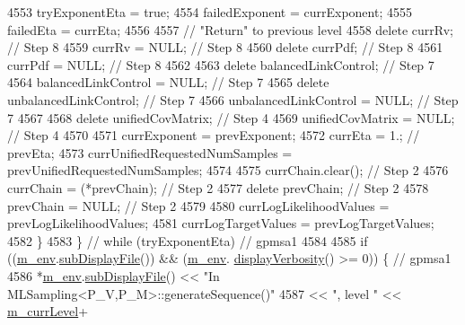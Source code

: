 \begin{DoxyCode}
{{4553       tryExponentEta = \textcolor{keyword}{true};
4554       failedExponent = currExponent;
4555       failedEta      = currEta;
4556 
4557       \textcolor{comment}{// "Return" to previous level}
4558       \textcolor{keyword}{delete} currRv;                 \textcolor{comment}{// Step 8}
4559       currRv = NULL;                 \textcolor{comment}{// Step 8}
4560       \textcolor{keyword}{delete} currPdf;                \textcolor{comment}{// Step 8}
4561       currPdf = NULL;                \textcolor{comment}{// Step 8}
4562 
4563       \textcolor{keyword}{delete} balancedLinkControl;    \textcolor{comment}{// Step 7}
4564       balancedLinkControl   = NULL;  \textcolor{comment}{// Step 7}
4565       \textcolor{keyword}{delete} unbalancedLinkControl;  \textcolor{comment}{// Step 7}
4566       unbalancedLinkControl = NULL;  \textcolor{comment}{// Step 7}
4567 
4568       \textcolor{keyword}{delete} unifiedCovMatrix;       \textcolor{comment}{// Step 4}
4569       unifiedCovMatrix = NULL;       \textcolor{comment}{// Step 4}
4570 
4571       currExponent                   = prevExponent;
4572       currEta                        = 1.; \textcolor{comment}{// prevEta;}
4573       currUnifiedRequestedNumSamples = prevUnifiedRequestedNumSamples;
4574 
4575       currChain.clear();             \textcolor{comment}{// Step 2}
4576       currChain = (*prevChain);      \textcolor{comment}{// Step 2}
4577       \textcolor{keyword}{delete} prevChain;              \textcolor{comment}{// Step 2}
4578       prevChain = NULL;              \textcolor{comment}{// Step 2}
4579 
4580       currLogLikelihoodValues        = prevLogLikelihoodValues;
4581       currLogTargetValues            = prevLogTargetValues;
4582     \}
4583     \} \textcolor{comment}{// while (tryExponentEta) // gpmsa1}
4584 
4585     \textcolor{keywordflow}{if} ((\hyperlink{class_q_u_e_s_o_1_1_m_l_sampling_a13f1ca4fe9f94822fe572a743eaced1d}{m\_env}.\hyperlink{class_q_u_e_s_o_1_1_base_environment_a8a0064746ae8dddfece4229b9ad374d6}{subDisplayFile}()) && (\hyperlink{class_q_u_e_s_o_1_1_m_l_sampling_a13f1ca4fe9f94822fe572a743eaced1d}{m\_env}.
      \hyperlink{class_q_u_e_s_o_1_1_base_environment_a1fe5f244fc0316a0ab3e37463f108b96}{displayVerbosity}() >= 0)) \{ \textcolor{comment}{// gpmsa1}
4586       *\hyperlink{class_q_u_e_s_o_1_1_m_l_sampling_a13f1ca4fe9f94822fe572a743eaced1d}{m\_env}.\hyperlink{class_q_u_e_s_o_1_1_base_environment_a8a0064746ae8dddfece4229b9ad374d6}{subDisplayFile}() << \textcolor{stringliteral}{"In MLSampling<P\_V,P\_M>::generateSequence()"}
4587                               << \textcolor{stringliteral}{", level "} << \hyperlink{class_q_u_e_s_o_1_1_m_l_sampling_af9416874c856e50f3b35270e801f17e4}{m\_currLevel}+
}}
\end{DoxyCode}
